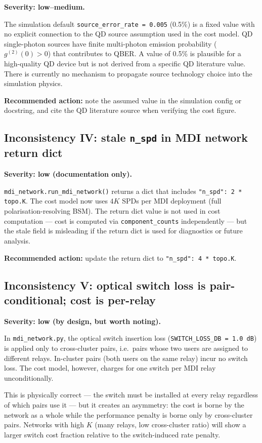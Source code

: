 \documentclass[12pt,a4paper]{article}
\begin{document}
\textbf{Severity: low--medium.}

The simulation default \texttt{source\_error\_rate = 0.005} (0.5\%) is a
fixed value with no explicit connection to the QD source assumption used in
the cost model. QD single-photon sources have finite multi-photon emission
probability ($g^{(2)}(0) > 0$) that contributes to QBER. A value of 0.5\%
is plausible for a high-quality QD device but is not derived from a specific
QD literature value. There is currently no mechanism to propagate source
technology choice into the simulation physics.

\textbf{Recommended action:} note the assumed value in the simulation config
or docstring, and cite the QD literature source when verifying the cost figure.

\subsection{Inconsistency IV: stale \texttt{n\_spd} in MDI network return dict}

\textbf{Severity: low (documentation only).}

\texttt{mdi\_network.run\_mdi\_network()} returns a dict that includes
\texttt{"n\_spd": 2 * topo.K}. The cost model now uses $4K$ SPDs per MDI
deployment (full polarisation-resolving BSM). The return dict value is not
used in cost computation --- cost is computed via \texttt{component\_counts}
independently --- but the stale field is misleading if the return dict is
used for diagnostics or future analysis.

\textbf{Recommended action:} update the return dict to \texttt{"n\_spd": 4 * topo.K}.

\subsection{Inconsistency V: optical switch loss is pair-conditional; cost is per-relay}

\textbf{Severity: low (by design, but worth noting).}

In \texttt{mdi\_network.py}, the optical switch insertion loss
(\texttt{SWITCH\_LOSS\_DB = 1.0\,dB}) is applied only to cross-cluster pairs,
i.e.\ pairs whose two users are assigned to different relays. In-cluster pairs
(both users on the same relay) incur no switch loss. The cost model, however,
charges for one switch per MDI relay unconditionally.

This is physically correct --- the switch must be installed at every relay
regardless of which pairs use it --- but it creates an asymmetry: the cost
is borne by the network as a whole while the performance penalty is borne only
by cross-cluster pairs. Networks with high $K$ (many relays, low cross-cluster
ratio) will show a larger switch cost fraction relative to the switch-induced
rate penalty.
\end{document}
